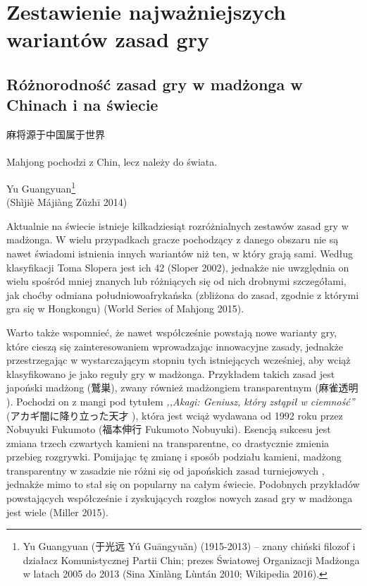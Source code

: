 \chapter{Zestawienie najważniejszych wariantów zasad gry}
\label{zestawienie_zasad}
\section{Różnorodność zasad gry w madżonga w Chinach i na świecie}
\epigraph{麻将源于中国属于世界 \\ 
\footnotesize {} \normalsize \\
Mahjong pochodzi z Chin, lecz
należy do świata.}{Yu Guangyuan\footnote{Yu Guangyuan (于光远 Yú
Guāngyuǎn) (1915-2013) -- znany chiński filozof i działacz Komunistycznej Partii
Chin; prezes Światowej Organizacji Madżonga w latach 2005 do 2013 (Sina
Xīnlàng Lùntán 2010; Wikipedia 2016).}
\\ (Shìjiè Májiàng Zǔzhī 2014)}

Aktualnie na świecie istnieje kilkadziesiąt rozróżnialnych zestawów zasad gry
w madżonga. W wielu przypadkach gracze pochodzący z danego obszaru nie są
nawet świadomi istnienia innych wariantów niż ten, w który grają sami. Według
klasyfikacji Toma Slopera jest ich 42 (Sloper 2002), jednakże nie uwzględnia on
wielu spośród mniej znanych lub różniących się od nich drobnymi szczegółami, jak
choćby odmiana południowoafrykańska (zbliżona do zasad, zgodnie z którymi gra
się w Hongkongu) (World Series of Mahjong 2015).

Warto także wspomnieć, że nawet współcześnie powstają nowe warianty gry, które
cieszą się zainteresowaniem wprowadzając innowacyjne zasady, jednakże przestrzegając w
wystarczającym stopniu tych istniejących wcześniej, aby wciąż klasyfikowano je
jako reguły gry w madżonga. \label{washizu} Przykładem takich zasad jest
japoński madżong  (鷲巣), zwany również madżongiem transparentnym
(麻雀透明 ). Pochodzi on z mangi pod tytułem \textit{,,Akagi:
Geniusz, który zstąpił w ciemność''} (アカギ闇に降り立った天才  
  ), która jest wciąż wydawana od
1992 roku przez \mbox{Nobuyuki} \mbox{Fukumoto} (福本伸行 \mbox{Fukumoto}
\mbox{Nobuyuki}).
Esencją sukcesu  jest zmiana trzech czwartych kamieni na transparentne, co
drastycznie zmienia przebieg rozgrywki. Pomijając tę zmianę i sposób podziału
kamieni, madżong transparentny w zasadzie nie różni się od japońskich zasad
turniejowych ,
jednakże mimo to stał się on popularny na całym świecie. Podobnych przykładów
powstających współcześnie i zyskujących rozgłos nowych zasad gry w madżonga jest
wiele (Miller 2015).

